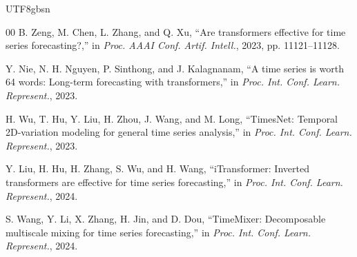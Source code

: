 \documentclass[journal,twoside,web]{ieeecolor}
\begin{document}
\begin{CJK*}{UTF8}{gbsn}
\begin{thebibliography}{00}
 B. Zeng, M. Chen, L. Zhang, and Q. Xu, ``Are transformers effective for time series forecasting?,'' in \emph{Proc. AAAI Conf. Artif. Intell.}, 2023, pp. 11121--11128.

 Y. Nie, N. H. Nguyen, P. Sinthong, and J. Kalagnanam, ``A time series is worth 64 words: Long-term forecasting with transformers,'' in \emph{Proc. Int. Conf. Learn. Represent.}, 2023.

 H. Wu, T. Hu, Y. Liu, H. Zhou, J. Wang, and M. Long, ``TimesNet: Temporal 2D-variation modeling for general time series analysis,'' in \emph{Proc. Int. Conf. Learn. Represent.}, 2023.

 Y. Liu, H. Hu, H. Zhang, S. Wu, and H. Wang, ``iTransformer: Inverted transformers are effective for time series forecasting,'' in \emph{Proc. Int. Conf. Learn. Represent.}, 2024.

 S. Wang, Y. Li, X. Zhang, H. Jin, and D. Dou, ``TimeMixer: Decomposable multiscale mixing for time series forecasting,'' in \emph{Proc. Int. Conf. Learn. Represent.}, 2024.

\end{thebibliography}

\end{CJK*}
\end{document}
